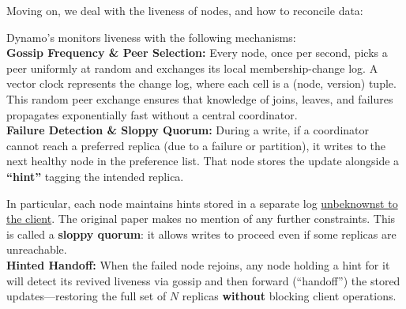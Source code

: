     \noindent
    Moving on, we deal with the liveness of nodes, and how to reconcile data:
    \begin{Def}

        Dynamo's monitors liveness with the following mechanisms:\\
      
        \noindent
        \textbf{Gossip Frequency \& Peer Selection:}  
        Every node, once per second, picks a peer uniformly at random and exchanges its local membership-change log. A vector clock represents the change log, where each cell is a (node, version) tuple.
        This random peer exchange ensures that knowledge of joins, leaves, and failures propagates exponentially fast without a central coordinator.\\
      
        \noindent
        \textbf{Failure Detection \& Sloppy Quorum:}  
        During a write, if a coordinator cannot reach a preferred replica (due to a failure or partition), it writes to the next healthy node in the preference list. That node stores the update alongside a \textbf{``hint''} tagging the intended replica.
        
        In particular, each node maintains hints stored in a separate log \underline{unbeknownst to the client}. The original paper makes no mention of any further constraints. This is called a \textbf{sloppy quorum}: it allows writes to proceed even if some replicas are unreachable.\\
        
      
        \noindent
        \textbf{Hinted Handoff:}  
        When the failed node rejoins, any node holding a hint for it will detect its revived liveness via gossip and then forward (“handoff”) the stored updates---restoring the full set of $N$ replicas \textbf{without} blocking client operations.
      \end{Def}

